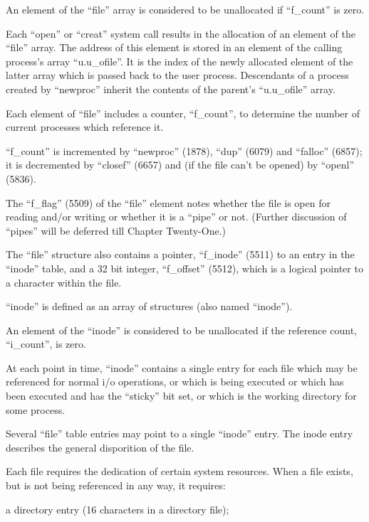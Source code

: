 An element of the ``file'' array is considered to be unallocated if ``f\_count''
is zero.

Each ``open'' or ``creat'' system call
results in the allocation of an element
of the ``file'' array. The address of
this element is stored in an element of
the calling process's array
``u.u\_ofile''. It is the index of the
newly allocated element of the latter
array which is passed back to the user
process. Descendants of a process
created by ``newproc'' inherit the
contents of the parent's ``u.u\_ofile''
array.


Each element of ``file'' includes a
counter, ``f\_count'', to determine the
number of current processes which
reference it.

``f\_count'' is incremented by ``newproc''
(1878), ``dup'' (6079) and ``falloc''
(6857); it is decremented by ``closef''
(6657) and (if the file can't be
opened) by ``openl'' (5836).

The ``f\_flag'' (5509) of the ``file'' element notes whether the file is open for
reading and/or writing or whether it is
a ``pipe'' or not. (Further discussion of
``pipes'' will be deferred till Chapter
Twenty-One.)

The ``file'' structure also contains a
pointer, ``f\_inode'' (5511) to an entry
in the ``inode'' table, and a 32 bit
integer, ``f\_offset'' (5512), which is a
logical pointer to a character within
the file.



``inode'' is defined as an array of
structures (also named ``inode'').


An element of the ``inode''
is considered to be unallocated if the reference
count, ``i\_count'', is zero.

At each point in time, ``inode'' contains
a single entry for each file which may
be referenced for normal i/o operations, or which is being executed or
which has been executed and has the
``sticky'' bit set, or which is the working directory for some process.


Several ``file'' table entries may point
to a single ``inode'' entry. The inode
entry describes the general disporition
of the file.


Each file requires the dedication of
certain system resources. When a file
exists, but is not being referenced in
any way, it requires:

\bd
\item[(a)] a directory entry (16 characters
 in a directory file);

